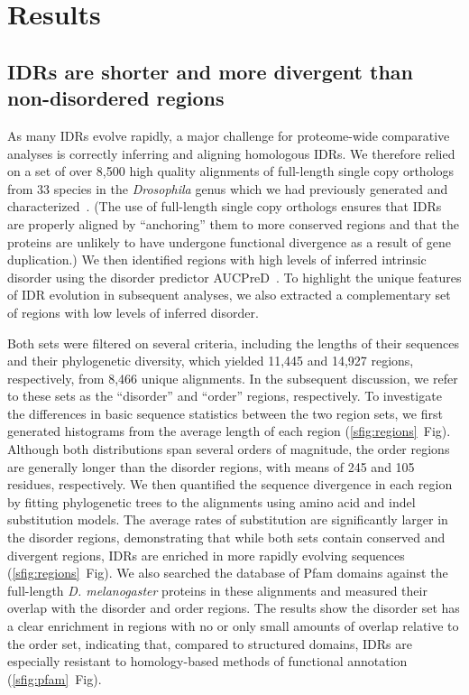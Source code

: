 \section{Results}
\subsection{IDRs are shorter and more divergent than non-disordered regions}
As many IDRs evolve rapidly, a major challenge for proteome-wide comparative analyses is correctly inferring and aligning homologous IDRs. We therefore relied on a set of over 8,500 high quality alignments of full-length single copy orthologs from 33 species in the \textit{Drosophila} genus which we had previously generated and characterized~\cite{Singleton2023}. (The use of full-length single copy orthologs ensures that IDRs are properly aligned by ``anchoring'' them to more conserved regions and that the proteins are unlikely to have undergone functional divergence as a result of gene duplication.) We then identified regions with high levels of inferred intrinsic disorder using the disorder predictor AUCPreD~\cite{Wang2016}. To highlight the unique features of IDR evolution in subsequent analyses, we also extracted a complementary set of regions with low levels of inferred disorder.

Both sets were filtered on several criteria, including the lengths of their sequences and their phylogenetic diversity, which yielded 11,445 and 14,927 regions, respectively, from 8,466 unique alignments. In the subsequent discussion, we refer to these sets as the ``disorder'' and ``order'' regions, respectively. To investigate the differences in basic sequence statistics between the two region sets, we first generated histograms from the average length of each region (\ref{sfig:regions}~Fig). Although both distributions span several orders of magnitude, the order regions are generally longer than the disorder regions, with means of 245 and 105 residues, respectively. We then quantified the sequence divergence in each region by fitting phylogenetic trees to the alignments using amino acid and indel substitution models. The average rates of substitution are significantly larger in the disorder regions, demonstrating that while both sets contain conserved and divergent regions, IDRs are enriched in more rapidly evolving sequences (\ref{sfig:regions}~Fig). We also searched the database of Pfam domains against the full-length \textit{D. melanogaster} proteins in these alignments and measured their overlap with the disorder and order regions. The results show the disorder set has a clear enrichment in regions with no or only small amounts of overlap relative to the order set, indicating that, compared to structured domains, IDRs are especially resistant to homology-based methods of functional annotation (\ref{sfig:pfam}~Fig).


